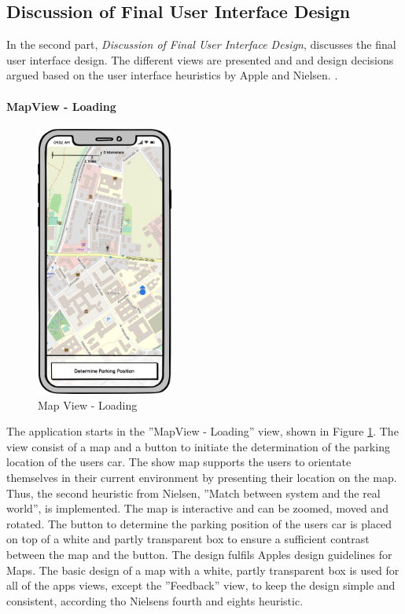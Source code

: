 \subsection{Discussion of Final User Interface Design}

In the second part, \textit{Discussion of Final User Interface Design}, discusses the final user interface design. The different views are presented and and design decisions argued based on the user interface heuristics by Apple and Nielsen. \cite{nielsen1994usability} \cite{apple:interfaceguidliines}.

\paragraph{MapView - Loading}

\begin{figure}[h]
    \centering
    \includegraphics[width=0.4\textwidth]{images/UI/Iteration4-MapView-Loading.png}
    \caption{Map View - Loading}
    \label{fig:mv-loading}
\end{figure}

The application starts in the ''MapView - Loading'' view, shown in Figure \ref{fig:mv-loading}. The view consist of a map and a button to initiate the determination of the parking location of the users car. The show map supports the users to orientate themselves in their current environment by presenting their location on the map. Thus, the second heuristic from Nielsen, ''Match between system and the real world'', is implemented. The map is interactive and can be zoomed, moved and rotated. The button to determine the parking position of the users car is placed on top of a white and partly transparent box to ensure a sufficient contrast between the map and the button. The design fulfils Apples design guidelines for Maps. The basic design of a map with a white, partly transparent box is used for all of the apps views, except the ''Feedback'' view, to keep the design simple and consistent, according tho Nielsens fourth and eights heuristic. \cite{nielsen1994usability} \cite{apple:interfaceguidliines}


